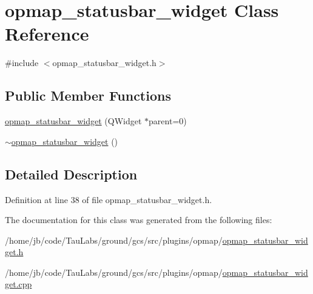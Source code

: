 \hypertarget{classopmap__statusbar__widget}{\section{opmap\-\_\-statusbar\-\_\-widget \-Class \-Reference}
\label{classopmap__statusbar__widget}
}


{\ttfamily \#include $<$opmap\-\_\-statusbar\-\_\-widget.\-h$>$}

\subsection*{\-Public \-Member \-Functions}
\begin{DoxyCompactItemize}
\item 
\hyperlink{group___o_p_map_plugin_gacb2a078a376c25f8ca59214a7a231122}{opmap\-\_\-statusbar\-\_\-widget} (\-Q\-Widget $\ast$parent=0)
\item 
\hyperlink{group___o_p_map_plugin_gaf9e51f27e900dce668581330be2f272f}{$\sim$opmap\-\_\-statusbar\-\_\-widget} ()
\end{DoxyCompactItemize}


\subsection{\-Detailed \-Description}


\-Definition at line 38 of file opmap\-\_\-statusbar\-\_\-widget.\-h.



\-The documentation for this class was generated from the following files\-:\begin{DoxyCompactItemize}
\item 
/home/jb/code/\-Tau\-Labs/ground/gcs/src/plugins/opmap/\hyperlink{opmap__statusbar__widget_8h}{opmap\-\_\-statusbar\-\_\-widget.\-h}\item 
/home/jb/code/\-Tau\-Labs/ground/gcs/src/plugins/opmap/\hyperlink{opmap__statusbar__widget_8cpp}{opmap\-\_\-statusbar\-\_\-widget.\-cpp}\end{DoxyCompactItemize}
